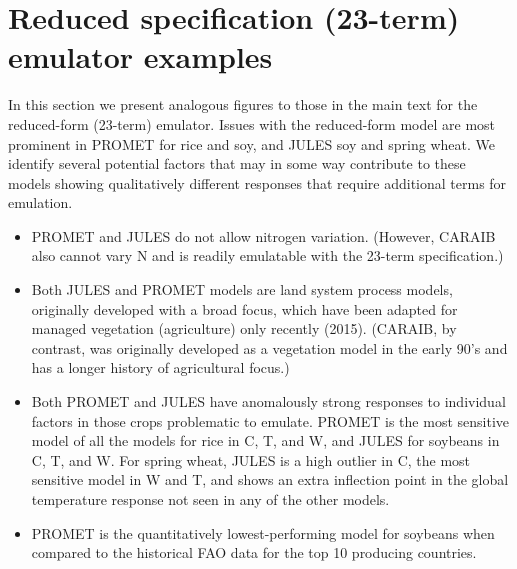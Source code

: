 \documentclass[12pt]{article}
\begin{document}
\section{Reduced specification (23-term) emulator examples}
\smallskip
\begin{justify}
In this section we present analogous figures to those in the main text for the reduced-form (23-term) emulator. 
Issues with the reduced-form model are most prominent in PROMET for rice and soy, and JULES soy and spring wheat. 
We identify several potential factors that may in some way contribute to these models showing qualitatively different responses that require additional terms for emulation.
	\begin{itemize}
		\item PROMET and JULES do not allow nitrogen variation. (However, CARAIB also cannot vary N and is readily emulatable with the 23-term specification.) 
		\item Both JULES and PROMET models are land system process models, originally developed with a broad focus, which have been adapted for managed vegetation (agriculture) only recently (2015). (CARAIB, by contrast, was originally developed as a vegetation model in the early 90's and has a longer history of agricultural focus.)
		\item Both PROMET and JULES have anomalously strong responses to individual factors in those crops problematic to emulate. PROMET is the most sensitive model of all the models for rice in C, T, and W, and JULES for soybeans in C, T, and W. For spring wheat, JULES is a high outlier in C, the most sensitive model in W and T, and shows an extra inflection point in the global temperature response not seen in any of the other models.
		\item PROMET is the quantitatively lowest-performing model for soybeans when compared to the historical FAO data for the top 10 producing countries. 
		\end{itemize}
\end{justify}
\end{document}
